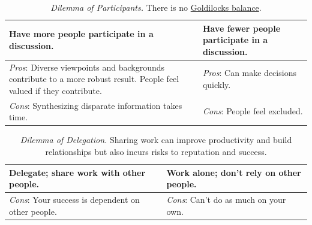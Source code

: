 \begin{center}
\begin{table}[H] %
\begin{tabular}{ | m{\dilemmatablewidth}| m{\dilemmatablewidth} | }
  \hline
  \textbf{Have more people participate in a discussion.} & 
  \textbf{Have fewer people participate in a discussion.} \\ 
  \hline
  \textit{Pros}: Diverse viewpoints and backgrounds contribute to a more robust result. People feel valued if they contribute. & 
  \textit{Pros}: Can make decisions quickly. \\  
  \hline
  \textit{Cons}: Synthesizing disparate information takes time. & 
  \textit{Cons}: People feel excluded. \\  
  \hline
\end{tabular}
\caption{
\textit{Dilemma of Participants.}
There is no \href{https://en.wikipedia.org/wiki/Goldilocks_principle}{Goldilocks balance}.
}
\label{table:dilemma-how-many-participants}
\end{table}
\end{center}
 



\begin{center}
\begin{table}[H] %
\begin{tabular}{ | m{\dilemmatablewidth}| m{\dilemmatablewidth} | } 
  \hline
  \textbf{Delegate; share work with other people.} & 
  \textbf{Work alone; don't rely on other people.} \\ 
  \hline
  \textit{Cons}: Your success is dependent on other people. & 
  \textit{Cons}: Can't do as much on your own. \\  
  \hline
\end{tabular}
\caption{
\textit{Dilemma of Delegation.}
Sharing work can improve productivity and build relationships but also incurs risks to reputation and success.
}
\label{table:dilemma-personal-delegate-or-not}
\end{table}
\end{center}

